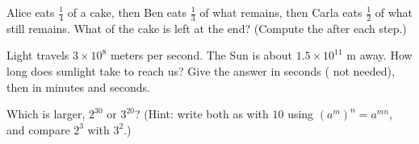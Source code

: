 \begin{exercise}[$\star\star$]\label{exo:g9:fractions:8}
Alice eats $\frac14$ of a cake, then Ben eats $\frac13$ of what remains,
then Carla eats $\frac12$ of what still remains. What  of the
cake is left at the end? (Compute the  after each step.)
\end{exercise}

\begin{exercise}[$\star\star$]\label{exo:g9:fractions:9}
Light travels $3 \times 10^8$ meters per second. The Sun is about
$1.5 \times 10^{11}$ m away. How long does sunlight take to reach us?
Give the answer in seconds ( not needed), then in
minutes and seconds.
\end{exercise}

\begin{exercise}[$\star\star\star$]\label{exo:g9:fractions:10}
Which is larger, $2^{30}$ or $3^{20}$? (Hint: write both as  with
 $10$ using $\left(a^m\right)^n = a^{mn}$, and compare $2^3$ with
$3^2$.)
\end{exercise}
